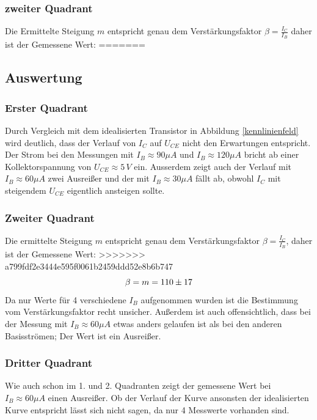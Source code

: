 \subsubsection{zweiter Quadrant}
Die Ermittelte Steigung \(m\) entspricht genau dem Verstärkungsfaktor \(\beta = \frac{I_C}{I_B}\) daher ist der Gemessene Wert:
=======

\subsection{Auswertung}
\subsubsection{Erster Quadrant}
Durch Vergleich mit dem idealisierten Transistor in Abbildung \ref{kennlinienfeld} wird deutlich, dass der Verlauf von \(I_C\) auf \(U_{CE}\) nicht den Erwartungen entspricht. Der Strom bei den Messungen mit \(I_B \approx 90 \mu A\) und \(I_B \approx 120 \mu A\) bricht ab einer Kollektorspannung von \(U_{CE} \approx 5\, V\) ein. Ausserdem zeigt auch der Verlauf mit \(I_B \approx 60 \mu A\) zwei Ausreißer und der mit \(I_B \approx 30 \mu A\) fällt ab, obwohl \(I_C\) mit steigendem \(U_{CE}\) eigentlich ansteigen sollte.

\subsubsection{Zweiter Quadrant}
Die ermittelte Steigung \(m\) entspricht genau dem Verstärkungsfaktor \(\beta = \frac{I_C}{I_B}\), daher ist der Gemessene Wert:
>>>>>>> a799fdf2e3444e595f0061b2459ddd52e8b6b747
\begin{equation}
\beta = m = 110 \pm 17 \notag
\end{equation}
Da nur Werte für 4 verschiedene \(I_{B}\) aufgenommen wurden ist die Bestimmung vom Verstärkungsfaktor recht unsicher. Außerdem ist auch offensichtlich, dass bei der Messung mit \(I_B \approx 60 \mu A\) etwas anders gelaufen ist als bei den anderen Basisströmen; Der Wert ist ein Ausreißer.
\subsubsection{Dritter Quadrant}
Wie auch schon im 1. und 2. Quadranten zeigt der gemessene Wert bei \(I_B \approx 60 \mu A\) einen Ausreißer. Ob der Verlauf der Kurve ansonsten der idealisierten Kurve entspricht lässt sich nicht sagen, da nur 4 Messwerte vorhanden sind.  

